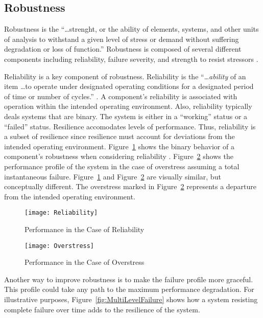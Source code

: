 


\subsection{Robustness}
Robustness is the ``\ldots strenght, or the ability of elements,
systems, and other units of analysis to withstand a given level of
stress or demand without suffering degradation or loss of function.''
Robustness is composed of several different components including
reliability, failure severity, and strength to resist
stressors \cite{Bruneau2003}.

Reliability is a key component of robustness. Reliability is the
``\ldots \emph{ability} of an item \ldots to operate under designated
operating conditions for a designated period of time or number of
cycles.'' \cite{Modarres2010}. A component's reliability is associated with operation
within the intended operating environment. Also, reliability typically
deals systems that are binary. The system is either in a ``working''
status or a ``failed'' status. Resilience accomodates levels of
performance. Thus, reliability is a subset
 of resilience since resilience must account for deviations from the
 intended operating environment. Figure~\ref{fig:Reliability} shows
 the binary behavior of a component's robustness when considering 
 reliability \cite{Ayyub2014c, Modarres2010, Rausand2004}.
 Figure~\ref{fig:Overstress} shows the performance
 profile of the system in the case of overstress assuming a total
 instantaneous failure. Figure~\ref{fig:Reliability} and
 Figure~\ref{fig:Overstress} are visually similar, but conceptually
 different. The overstress marked in Figure~\ref{fig:Overstress}
 represents a departure from the intended operating environment.

\begin{figure}
 \centering
 \texttt{[image: Reliability]}
 \label{fig:Reliability}
 \caption{Performance in the Case of Reliability}
\end{figure}
 
\begin{figure}
  \centering
  \texttt{[image: Overstress]}
  \label{fig:Overstress}
  \caption{Performance in the Case of Overstress}
\end{figure}

Another way to improve robustness is to make the failure profile more
graceful. This profile could take any path to the maximum performance
degradation. For illustrative purposes,
Figure~\ref{fig:MultiLevelFailure} shows how a system resisting
complete failure over time adds to the resilience of the system. 

